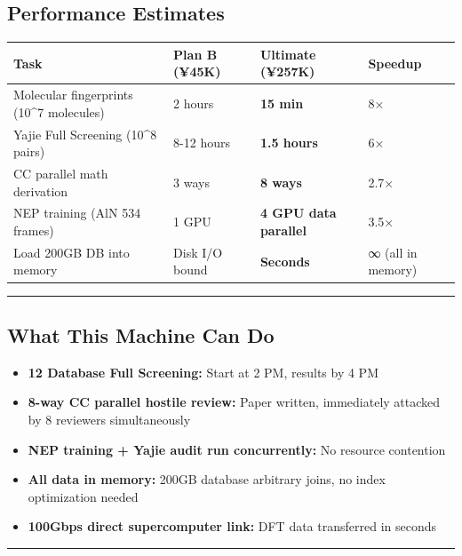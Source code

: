 \documentclass[
  12pt,
]{article}
\providecommand{\tightlist}{%
  \setlength{\itemsep}{0pt}\setlength{\parskip}{0pt}}
\begin{document}
\subsection{Performance Estimates}\label{performance-estimates}

\begin{longtable}[]{@{}llll@{}}
\toprule\noalign{}
Task & Plan B (¥45K) & Ultimate (¥257K) & Speedup \\
\midrule\noalign{}
\endhead
\bottomrule\noalign{}
\endlastfoot
Molecular fingerprints (10\^{}7 molecules) & 2 hours & \textbf{15 min} & 8× \\
Yajie Full Screening (10\^{}8 pairs) & 8-12 hours & \textbf{1.5 hours} & 6× \\
CC parallel math derivation & 3 ways & \textbf{8 ways} & 2.7× \\
NEP training (AlN 534 frames) & 1 GPU & \textbf{4 GPU data parallel} & 3.5× \\
Load 200GB DB into memory & Disk I/O bound & \textbf{Seconds} & ∞ (all in memory) \\
\end{longtable}

\begin{center}\rule{0.5\linewidth}{0.5pt}\end{center}

\subsection{What This Machine Can Do}\label{what-this-machine-can-do}

\begin{itemize}
\tightlist
\item
  \textbf{12 Database Full Screening:} Start at 2 PM, results by 4 PM
\item
  \textbf{8-way CC parallel hostile review:} Paper written, immediately attacked by 8 reviewers simultaneously
\item
  \textbf{NEP training + Yajie audit run concurrently:} No resource contention
\item
  \textbf{All data in memory:} 200GB database arbitrary joins, no index optimization needed
\item
  \textbf{100Gbps direct supercomputer link:} DFT data transferred in seconds
\end{itemize}

\begin{center}\rule{0.5\linewidth}{0.5pt}\end{center}
\end{document}
